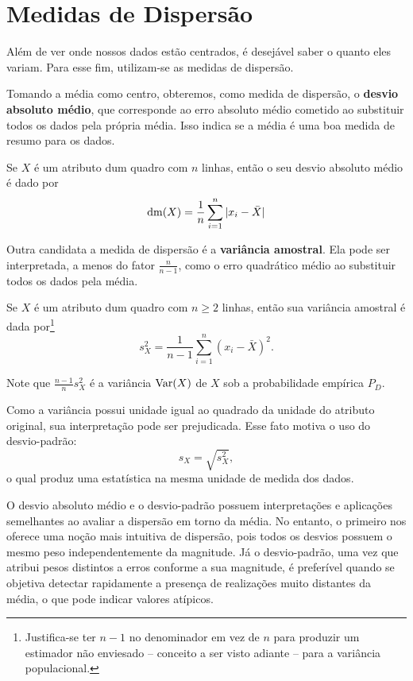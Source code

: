 \section{Medidas de Dispersão}

Além de ver onde nossos dados estão centrados, é desejável saber o quanto eles variam.
Para esse fim, utilizam-se as medidas de dispersão.

Tomando a média como centro, obteremos, como medida de dispersão, o \textbf{desvio absoluto
médio}, que corresponde ao erro absoluto médio cometido ao substituir todos
os dados pela própria média.
Isso indica se a média é uma boa medida de resumo para os dados.
\begin{def:desvio absoluto medio}
Se $X$ é um atributo dum quadro com $n$ linhas, então o seu desvio absoluto médio
é dado por
\[
	\mathrm{dm}\!\left(X\right) = \frac{1}{n} \sum_{i=1}^n |x_i - \bar X|
\]
\end{def:desvio absoluto medio}

Outra candidata a medida de dispersão é a \textbf{variância amostral}.
Ela pode ser interpretada, a menos do fator $\frac{n}{n-1}$, como o erro quadrático médio
ao substituir todos os dados pela média.
\begin{def:variancia amostral}
Se $X$ é um atributo dum quadro com $n \ge 2$ linhas, então sua variância amostral é dada
por\footnote{Justifica-se ter $n-1$ no denominador em vez de $n$ para produzir um
estimador não enviesado -- conceito a ser visto adiante -- para a variância populacional.}
\[
	s_X^2 = \frac{1}{n-1} \sum_{i=1}^n (x_i - \bar X)^2.
\]
\end{def:variancia amostral}
Note que $\frac{n-1}{n} s_X^2$ é a variância $\mathrm{Var}\!\left(X\right)$ de $X$ sob a probabilidade
empírica $P_D$.

Como a variância possui unidade igual ao quadrado da unidade do atributo original,
sua interpretação pode ser prejudicada.
Esse fato motiva o uso do desvio-padrão:
\[
	s_X = \sqrt{s_X^2},
\]
o qual produz uma estatística na mesma unidade de medida dos dados.

O desvio absoluto médio e o desvio-padrão possuem interpretações e aplicações semelhantes
ao avaliar a dispersão em torno da média.
No entanto, o primeiro nos oferece uma noção mais intuitiva de dispersão, pois todos os
desvios possuem o mesmo peso independentemente da magnitude.
Já o desvio-padrão, uma vez que atribui pesos distintos a erros conforme a sua magnitude,
é preferível quando se objetiva detectar rapidamente a presença de realizações muito distantes
da média, o que pode indicar valores atípicos.

